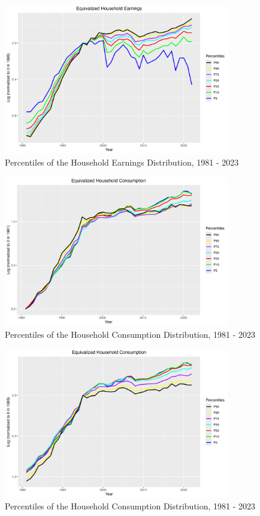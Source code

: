 \documentclass{article}
\begin{document}
\begin{appendices}
\begin{figure}[ht]
    \centering
    \includegraphics[width=0.88\textwidth]{figures/Fig_2/Fig_2_percentiles_1995.png}
    \caption{Percentiles of the Household Earnings Distribution, 1981 - 2023}
    \label{fig:appendix_cyclic_earnings_1995}
\end{figure}

\begin{figure}[ht]
    \centering
    \includegraphics[width=0.88\textwidth]{figures/Fig_7/Fig_7_percentiles_1981.png}
    \caption{Percentiles of the Household Consumption Distribution, 1981 - 2023}
    \label{fig:appendix_cyclic_consumption_1981}
\end{figure}

\begin{figure}[ht]
    \centering
    \includegraphics[width=0.88\textwidth]{figures/Fig_7/Fig_7_percentiles_1995.png}
    \caption{Percentiles of the Household Consumption Distribution, 1981 - 2023}
    \label{fig:appendix_cyclic_consumption_1995}
\end{figure}

\end{appendices}
\end{document}
